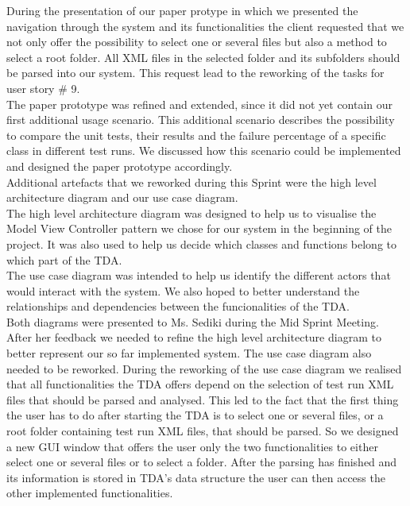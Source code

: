 During the presentation of our paper protype in which we presented the navigation through the system and its functionalities the client requested that we not only offer the possibility to select one or several files but also a method to select a root folder. All XML files in the selected folder and its subfolders should be parsed into our system. This request lead to the reworking of the tasks for user story \# 9. \\ 

The paper prototype was refined and extended, since it did not yet contain our first additional usage scenario. This additional scenario describes the possibility to compare the unit tests, their results and the failure percentage of a specific class in different test runs. We discussed how this scenario could be implemented and designed the paper prototype accordingly. \\ 

Additional artefacts that we reworked during this Sprint were the high level architecture diagram and our use case diagram. \\ 
The high level architecture diagram was designed to help us to visualise the Model View Controller pattern we chose for our system in the beginning of the project. It was also used to help us decide which classes and functions belong to which part of the TDA. \\ 
The use case diagram was intended to help us identify the different actors that would interact with the system. We also hoped to better understand the relationships and dependencies between the funcionalities of the TDA. \\ 

Both diagrams were presented to Ms. Sediki during the Mid Sprint Meeting. After her feedback we needed to refine the high level architecture diagram to better represent our so far implemented system. The use case diagram also needed to be reworked. During the reworking of the use case diagram we realised that all functionalities the TDA offers depend on the selection of test run XML files that should be parsed and analysed. This led to the fact that the first thing the user has to do after starting the TDA is to select one or several files, or a root folder containing test run XML files, that should be parsed. So we designed a new GUI window that offers the user only the two functionalities to either select one or several files or to select a folder. After the parsing has finished and its information is stored in TDA's data structure the user can then access the other implemented functionalities.

